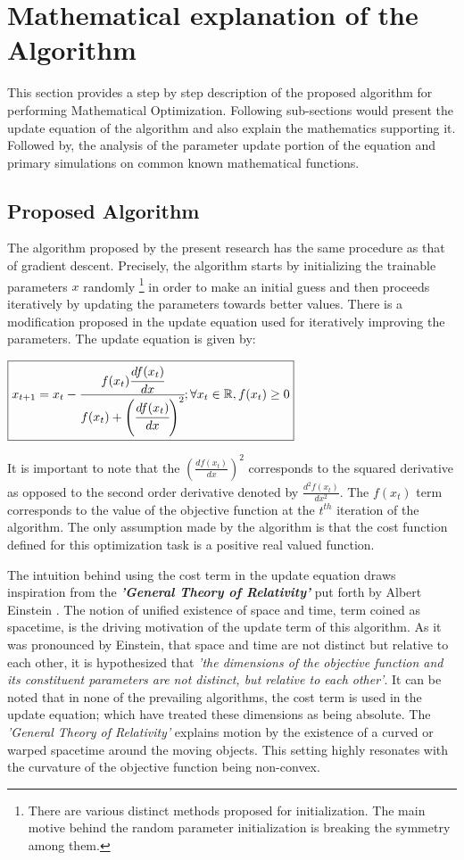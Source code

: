 \documentclass{article}
\begin{document}
\section{Mathematical explanation of the Algorithm}
This section provides a step by step description of the proposed algorithm for performing Mathematical Optimization.
Following sub-sections would present the update equation of the algorithm and also explain the mathematics supporting it. Followed by, the analysis of the parameter update portion of the equation and primary simulations on common known mathematical functions.

\subsection{Proposed Algorithm}
The algorithm proposed by the present research has the same procedure as that of gradient descent. Precisely, the algorithm starts by initializing the trainable parameters $x$ randomly \footnote{There are various distinct methods proposed for initialization. The main motive behind the random parameter initialization is breaking the symmetry among them.} in order to make an initial guess and then proceeds iteratively by updating the parameters towards better values. There is a modification proposed in the update equation used for iteratively improving the parameters. The update equation is given by:

\begin{center}	
	$\boxed{x_{t + 1} = x_{t}  - \cfrac{f(x_t) \cfrac{df(x_t)}{dx}}{f(x_t) + \left(\cfrac{df(x_t)}{dx}\right)^2}; \forall x_t \in \mathbb{R}, f(x_t) \geq 0 }$
	
\end{center}

It is important to note that the $\left(\frac{df(x_t)}{dx}\right)^2$ corresponds to the squared derivative as opposed to the second order derivative denoted by $\frac{d^2f(x_t)}{dx^2}$. The $f(x_t)$ term corresponds to the value of the objective function at the $t^{th}$ iteration of the algorithm. The only assumption made by the algorithm is that the cost function defined for this optimization task is a positive real valued function.


The intuition behind using the cost term in the update equation draws inspiration from the \textbf{\textit{'General Theory of Relativity'}} put forth by Albert Einstein \cite{einstein:relativity}. The notion of unified existence of space and time, term coined as spacetime, is the driving motivation of the update term of this algorithm. As it was pronounced by Einstein, that space and time are not distinct but relative to each other, it is hypothesized that \textit{'the dimensions of the objective function and its constituent parameters are not distinct, but relative to each other'}. It can be noted that in none of the prevailing algorithms, the cost term is used in the update equation; which have treated these dimensions as being absolute. The \textit{'General Theory of Relativity'} explains motion by the existence of a curved or warped spacetime around the moving objects. This setting highly resonates with the curvature of the objective function being non-convex.
\end{document}
